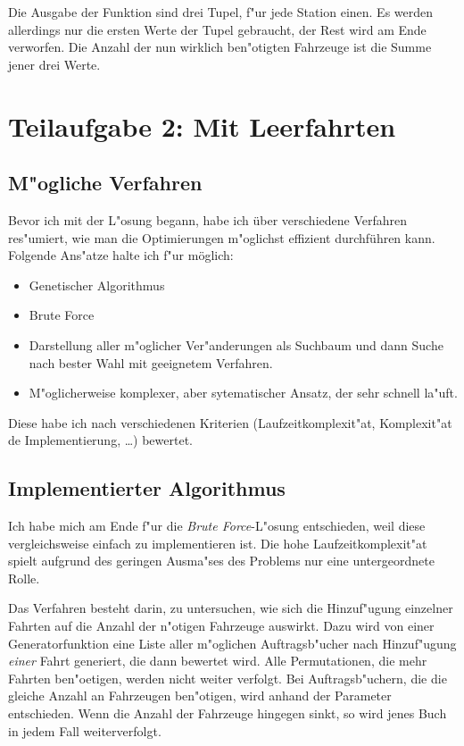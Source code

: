 \documentclass{scrreprt}
\begin{document}
Die Ausgabe der Funktion sind drei Tupel, f"ur jede Station einen.  Es werden
allerdings nur die ersten Werte der Tupel gebraucht, der Rest wird am Ende
verworfen. Die Anzahl der nun wirklich ben"otigten Fahrzeuge ist die Summe jener
drei Werte.

\chapter{Teilaufgabe 2: Mit Leerfahrten}

\section{M"ogliche Verfahren}
Bevor ich mit der L"osung begann, habe ich über verschiedene Verfahren
res"umiert, wie man die Optimierungen m"oglichst effizient durchführen kann.
Folgende Ans"atze halte ich f"ur möglich:

\begin{itemize}
\item Genetischer Algorithmus
\item Brute Force
\item Darstellung aller m"oglicher Ver"anderungen als Suchbaum und dann Suche
nach bester Wahl mit geeignetem Verfahren.
\item M"oglicherweise komplexer, aber sytematischer Ansatz, der sehr schnell
la"uft.
\end{itemize}
Diese habe ich nach verschiedenen Kriterien (Laufzeitkomplexit"at, Komplexit"at
de Implementierung, \dots ) bewertet.

\section{Implementierter Algorithmus}
Ich habe mich am Ende f"ur die \emph{Brute Force}-L"osung entschieden, weil
diese vergleichsweise einfach zu implementieren ist.  Die hohe
Laufzeitkomplexit"at spielt aufgrund des geringen Ausma"ses des Problems nur
eine untergeordnete Rolle.

Das Verfahren besteht darin, zu untersuchen, wie sich die Hinzuf"ugung einzelner
Fahrten auf die Anzahl der n"otigen Fahrzeuge auswirkt.  Dazu wird von einer
Generatorfunktion eine Liste aller m"oglichen Auftragsb"ucher nach Hinzuf"ugung
\emph{einer} Fahrt generiert, die dann bewertet wird.  Alle Permutationen, die
mehr Fahrten ben"oetigen, werden nicht weiter verfolgt.  Bei Auftragsb"uchern,
die die gleiche Anzahl an Fahrzeugen ben"otigen, wird anhand der Parameter
entschieden.  Wenn die Anzahl der Fahrzeuge hingegen sinkt, so wird jenes Buch
in jedem Fall weiterverfolgt.
\end{document}
